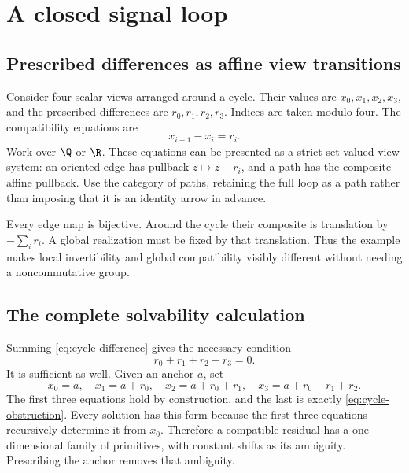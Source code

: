 \section{A closed signal loop}\label{sec:signal-loop}
\subsection{Prescribed differences as affine view transitions}
Consider four scalar views arranged around a cycle. Their values are \(x_0,x_1,x_2,x_3\), and the prescribed differences are \(r_0,r_1,r_2,r_3\). Indices are taken modulo four. The compatibility equations are
\begin{equation}\label{eq:cycle-difference}
 x_{i+1}-x_i=r_i.
\end{equation}
Work over \(\Q\) or \(\R\). These equations can be presented as a strict set-valued view system: an oriented edge has pullback \(z\mapsto z-r_i\), and a path has the composite affine pullback. Use the category of paths, retaining the full loop as a path rather than imposing that it is an identity arrow in advance.

Every edge map is bijective. Around the cycle their composite is translation by \(-\sum_i r_i\). A global realization must be fixed by that translation. Thus the example makes local invertibility and global compatibility visibly different without needing a noncommutative group.

\subsection{The complete solvability calculation}
Summing \eqref{eq:cycle-difference} gives the necessary condition
\begin{equation}\label{eq:cycle-obstruction}
 r_0+r_1+r_2+r_3=0.
\end{equation}
It is sufficient as well. Given an anchor \(a\), set
\[
 x_0=a,\quad x_1=a+r_0,\quad
 x_2=a+r_0+r_1,\quad x_3=a+r_0+r_1+r_2.
\]
The first three equations hold by construction, and the last is exactly \eqref{eq:cycle-obstruction}. Every solution has this form because the first three equations recursively determine it from \(x_0\). Therefore a compatible residual has a one-dimensional family of primitives, with constant shifts as its ambiguity. Prescribing the anchor removes that ambiguity.

